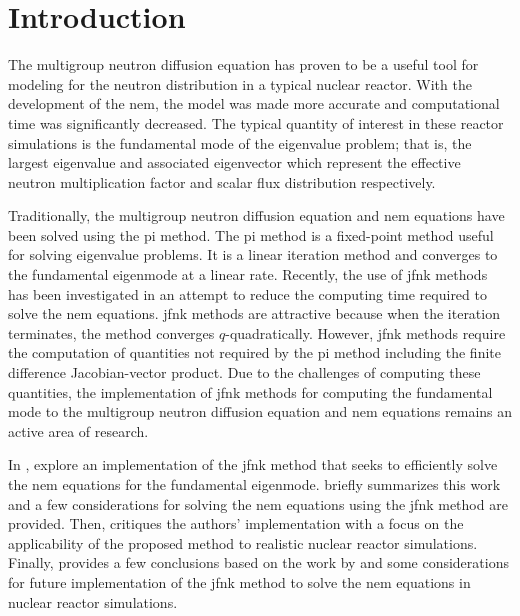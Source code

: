 \section{Introduction}
\label{sec:introduction}

  The multigroup neutron diffusion equation has proven to be a useful tool for
  modeling for the neutron distribution in a typical nuclear reactor. With the
  development of the \gls{nem}, the model was made more accurate and
  computational time was significantly decreased. The typical quantity of
  interest in these reactor simulations is the fundamental mode of the
  eigenvalue problem; that is, the largest eigenvalue and associated eigenvector
  which represent the effective neutron multiplication factor and scalar flux
  distribution respectively.

  Traditionally, the multigroup neutron diffusion equation and \gls{nem}
  equations have been solved using the \gls{pi} method. The \gls{pi} method is a
  fixed-point method useful for solving eigenvalue problems. It is a linear
  iteration method and converges to the fundamental eigenmode at a linear rate.
  Recently, the use of \gls{jfnk} methods has been investigated in an attempt to
  reduce the computing time required to solve the \gls{nem} equations.
  \gls{jfnk} methods are attractive because when the iteration terminates, the
  method converges $q$-quadratically. However, \gls{jfnk} methods require the
  computation of quantities not required by the \gls{pi} method including the
  finite difference Jacobian-vector product. Due to the challenges of computing
  these quantities, the implementation of \gls{jfnk} methods for computing the
  fundamental mode to the multigroup neutron diffusion equation and \gls{nem}
  equations remains an active area of research.

  In , \citeauthor{qe2paper} explore an implementation of
  the \gls{jfnk} method that seeks to efficiently solve the \gls{nem} equations
  for the fundamental eigenmode.  briefly summarizes this work
  and a few considerations for solving the \gls{nem} equations using the
  \gls{jfnk} method are provided. Then,  critiques the
  authors' implementation with a focus on the applicability of the proposed
  method to realistic nuclear reactor simulations. Finally,
   provides a few conclusions based on the work by
  \citeauthor{qe2paper} and some considerations for future implementation of the
  \gls{jfnk} method to solve the \gls{nem} equations in nuclear reactor
  simulations.
